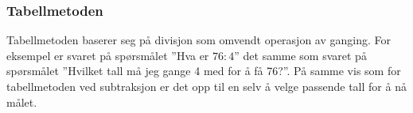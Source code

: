 \subsubsection{Tabellmetoden}
Tabellmetoden baserer seg på divisjon som omvendt operasjon av ganging. For eksempel er svaret på spørsmålet ''Hva er $ {76:4} $'' det samme som svaret på spørsmålet ''Hvilket tall må jeg gange 4 med for å få 76?''. På samme vis som for tabellmetoden ved subtraksjon er det opp til en selv å velge passende tall for å nå målet.
\begin{center}
	\parbox{0.35\linewidth}{
		} \qquad
\parbox{0.35\linewidth}{
	} \vsk

\parbox{0.415\linewidth}{
}
\end{center}
\newpage
